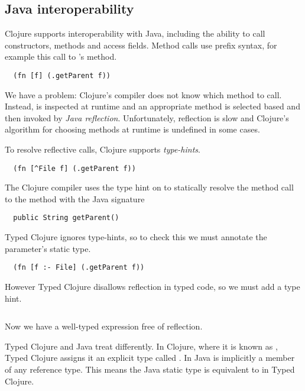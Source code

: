 \subsection{Java interoperability}

Clojure supports interoperability with Java, including the ability to
call constructors, methods and access fields.
Method calls use prefix syntax, for example this call to 
's  method.

\begin{verbatim}
  (fn [f] (.getParent f))
\end{verbatim}

We have a problem: Clojure's compiler does not know which method to call.
Instead,  is inspected at runtime and an appropriate method is selected based
and then invoked by \emph{Java reflection}.
Unfortunately, reflection is slow and Clojure's algorithm for
choosing methods at runtime is undefined in some cases.

To resolve reflective calls, Clojure supports \emph{type-hints}.

\begin{verbatim}
  (fn [^File f] (.getParent f))
\end{verbatim}

The Clojure compiler uses the type hint on 
to statically resolve the method call to the 
method with the Java signature

\begin{verbatim}
  public String getParent()
\end{verbatim}

Typed Clojure ignores type-hints, so to check this we must
annotate the parameter's static type.

\begin{verbatim}
  (fn [f :- File] (.getParent f))
\end{verbatim}

However Typed Clojure disallows reflection in typed code, so we
must add a type hint.

\inputminted[firstline=10,lastline=10]{clojure}{code/demo/src/demo/parent3.clj}

Now we have a well-typed expression free of reflection.

Typed Clojure and Java treat  differently.
In Clojure, where it is known as , Typed Clojure assigns it an explicit type
called . In Java  is implicitly a member of any reference type.
This means the Java static type  is equivalent to
 in Typed Clojure.

